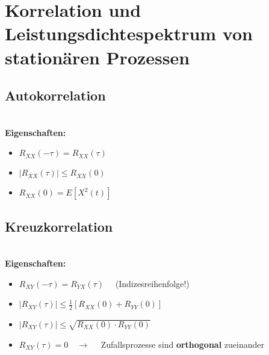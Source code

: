 		\section{Korrelation und Leistungsdichtespektrum von stationären Prozessen}
			\vspace*{-0.7cm}\begin{minipage}[t]{0.35\textwidth}
				\subsection{Autokorrelation}
					\vspace*{0.15cm}\\[0.2cm]
					\textbf{Eigenschaften:}\\[-0.4cm]
					\begin{itemize}
						\item $R_{XX}(-\tau) = R_{XX}(\tau)$\\[-0.25cm]
						\item $\left| R_{XX}(\tau)\right| \leq R_{XX}(0)$\\[-0.25cm]
						\item $R_{XX}(0) = E[X^2(t)]$
					\end{itemize}
			\end{minipage}
			\begin{minipage}[t]{0.65\textwidth}
				\subsection{Kreuzkorrelation}
					\vspace*{0.15cm}\\[0.2cm]
					\textbf{Eigenschaften:}\\[-0.4cm]
					\begin{itemize}
						\item $R_{XY}(-\tau) = R_{YX}(\tau)\quad$ (Indizesreihenfolge!)\\[-0.25cm]
						\item $\left| R_{XY}(\tau)\right| \leq \frac{1}{2}\left[R_{XX}(0) + R_{YY}(0)\right]$\\[-0.25cm]
						\item $\left| R_{XY}(\tau)\right| \leq \sqrt{R_{XX}(0)\cdot R_{YY}(0)}$\\[-0.25cm]
						\item $R_{XY}(\tau) = 0 \quad\rightarrow\quad$ Zufallsprozesse sind \textbf{orthogonal} zueinander
					\end{itemize}
			\end{minipage}

